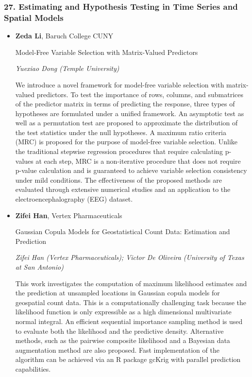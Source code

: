\subsubsection*{27. Estimating and Hypothesis Testing in Time Series and Spatial Models}

\begin{itemize}
\item \textbf{Zeda Li}, Baruch College CUNY

Model-Free Variable Selection with Matrix-Valued Predictors

\emph{\footnotesize Yuexiao Dong (Temple University)}

We introduce a novel framework for model-free variable selection with matrix-valued predictors. To test the importance of rows, columns, and submatrices of the predictor matrix in terms of predicting the response, three types of hypotheses are formulated under a unified framework. An asymptotic test as well as a permutation test are proposed to approximate the distribution of the test statistics under the null hypotheses. A maximum ratio criteria (MRC) is proposed for the purpose of model-free variable selection. Unlike the traditional stepwise regression procedures that require calculating p-values at each step, MRC is a non-iterative procedure that does not require p-value calculation and is guaranteed to achieve variable selection consistency under mild conditions. The effectiveness of the proposed methods are evaluated through extensive numerical studies and an application to the electroencephalography (EEG) dataset.

\item \textbf{Zifei Han}, Vertex Pharmaceuticals

Gaussian Copula Models for Geostatistical Count Data: Estimation and Prediction

\emph{\footnotesize Zifei Han (Vertex Pharmaceuticals); Victor De Oliveira (University of Texas at San Antonio)}

This work investigates the computation of maximum likelihood estimates and the prediction at unsampled locations in Gaussian copula models for geospatial count data. This is a computationally challenging task because the likelihood function is only expressible as a high dimensional multivariate normal integral. An efficient sequential importance sampling method is used to evaluate both the likelihood and the predictive density. Alternative methods, such as the pairwise composite likelihood and a Bayesian data augmentation method are also proposed. Fast implementation of the algorithm can be achieved via an R package gcKrig with parallel prediction capabilities.


\end{itemize}

